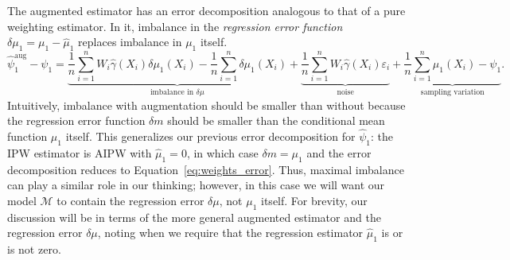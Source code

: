 \documentclass{article}
\theoremstyle{definition}
\newcommand{\dm}{\delta \mu}
\newcommand{\model}{\mathcal{M}}
\newcommand{\aug}{\text{aug}}
\newcommand{\<}{\langle}
\renewcommand{\>}{\rangle}
\newcommand\cmnt[2]{\;
{\textcolor{red}{[{\em #1 --- #2}] \;}
}}
\newcommand\avi[1]{\cmnt{#1}{Avi}}
\newcommand\dah[1]{\cmnt{#1}{Skip}}
\begin{document}
The augmented estimator has an error decomposition analogous to that of a pure weighting estimator. In it, imbalance in the \emph{regression error function}
$\delta \mu_1 = \mu_1-\hat \mu_1$ replaces imbalance in $\mu_1$ itself.
\begin{equation}
    \label{eq:weights_error_aug}
    \hat{\psi}^{\aug}_1 - \psi_1 = \underbrace{\frac{1}{n}\sum_{i=1}^nW_i\hat{\gamma}(X_i) \delta \mu_1(X_i) - \frac{1}{n}\sum_{i=1}^n \delta \mu_1(X_i)}_{\text{imbalance in $\dm$}} + \underbrace{\frac{1}{n}\sum_{i=1}^n W_i\hat{\gamma}(X_i) \varepsilon_i}_{\text{noise}} + \underbrace{\frac{1}{n}\sum_{i=1}^{n} \mu_1(X_i) - \psi_1}_{\text{sampling variation}}.
\end{equation}
Intuitively, imbalance with augmentation should be smaller than without because the regression error function $\delta m$ should be smaller than the conditional mean function $\mu_1$ itself.
This generalizes our previous error decomposition for $\hat\psi_1$: the IPW estimator is AIPW with $\hat \mu_1=0$, in which case $\delta m=\mu_1$ and the error decomposition reduces to Equation~\ref{eq:weights_error}.
Thus, maximal imbalance can play a similar role in our thinking;
however, in this case we will want our model $\model$ to contain the regression error $\dm$, not $\mu_1$ itself.
For brevity, our discussion will be in terms of the more general augmented estimator and the regression error $\dm$,
noting when we require that the regression estimator $\hat \mu_1$ is or is not zero.
\end{document}
